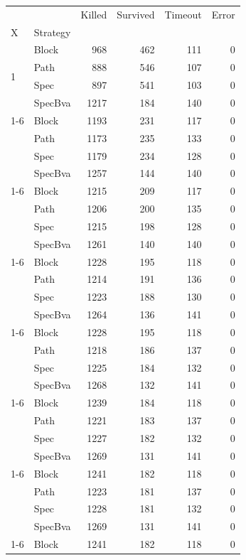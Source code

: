 \begin{tabular}{llrrrr}
\toprule
 &  & Killed & Survived & Timeout & Error \\
X & Strategy &  &  &  &  \\
\midrule
\multirow[t]{4}{*}{1} & Block & 968 & 462 & 111 & 0 \\
 & Path & 888 & 546 & 107 & 0 \\
 & Spec & 897 & 541 & 103 & 0 \\
 & SpecBva & 1217 & 184 & 140 & 0 \\
\cline{1-6}
\multirow[t]{4}{*}{2} & Block & 1193 & 231 & 117 & 0 \\
 & Path & 1173 & 235 & 133 & 0 \\
 & Spec & 1179 & 234 & 128 & 0 \\
 & SpecBva & 1257 & 144 & 140 & 0 \\
\cline{1-6}
\multirow[t]{4}{*}{3} & Block & 1215 & 209 & 117 & 0 \\
 & Path & 1206 & 200 & 135 & 0 \\
 & Spec & 1215 & 198 & 128 & 0 \\
 & SpecBva & 1261 & 140 & 140 & 0 \\
\cline{1-6}
\multirow[t]{4}{*}{4} & Block & 1228 & 195 & 118 & 0 \\
 & Path & 1214 & 191 & 136 & 0 \\
 & Spec & 1223 & 188 & 130 & 0 \\
 & SpecBva & 1264 & 136 & 141 & 0 \\
\cline{1-6}
\multirow[t]{4}{*}{5} & Block & 1228 & 195 & 118 & 0 \\
 & Path & 1218 & 186 & 137 & 0 \\
 & Spec & 1225 & 184 & 132 & 0 \\
 & SpecBva & 1268 & 132 & 141 & 0 \\
\cline{1-6}
\multirow[t]{4}{*}{6} & Block & 1239 & 184 & 118 & 0 \\
 & Path & 1221 & 183 & 137 & 0 \\
 & Spec & 1227 & 182 & 132 & 0 \\
 & SpecBva & 1269 & 131 & 141 & 0 \\
\cline{1-6}
\multirow[t]{4}{*}{7} & Block & 1241 & 182 & 118 & 0 \\
 & Path & 1223 & 181 & 137 & 0 \\
 & Spec & 1228 & 181 & 132 & 0 \\
 & SpecBva & 1269 & 131 & 141 & 0 \\
\cline{1-6}
\multirow[t]{4}{*}{8} & Block & 1241 & 182 & 118 & 0 \\

\end{tabular}
